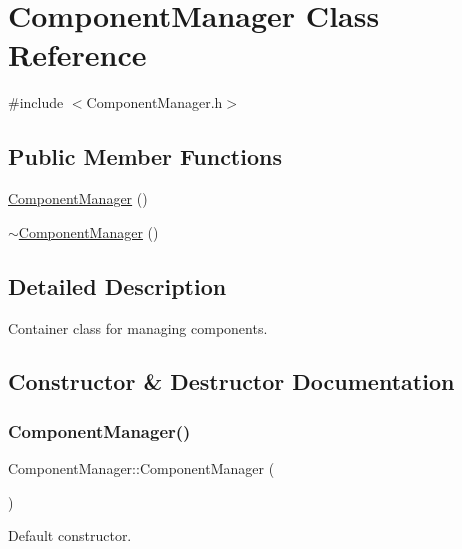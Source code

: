 \hypertarget{class_component_manager}{}\section{Component\+Manager Class Reference}
\label{class_component_manager}


{\ttfamily \#include $<$Component\+Manager.\+h$>$}

\subsection*{Public Member Functions}
\begin{DoxyCompactItemize}
\item 
\mbox{\hyperlink{class_component_manager_addccd94a0556362431571f1f749a1afe}{Component\+Manager}} ()
\item 
\mbox{\hyperlink{class_component_manager_aa4269438ec6e184a60ea15423bb2fb6c}{$\sim$\+Component\+Manager}} ()
\end{DoxyCompactItemize}


\subsection{Detailed Description}
Container class for managing components. 

\subsection{Constructor \& Destructor Documentation}
\mbox{\label{class_component_manager_addccd94a0556362431571f1f749a1afe}} 
\subsubsection{\texorpdfstring{Component\+Manager()}{ComponentManager()}}
{\footnotesize\ttfamily Component\+Manager\+::\+Component\+Manager (\begin{DoxyParamCaption}{ }\end{DoxyParamCaption})}

Default constructor. \mbox{\label{class_component_manager_aa4269438ec6e184a60ea15423bb2fb6c}} 
